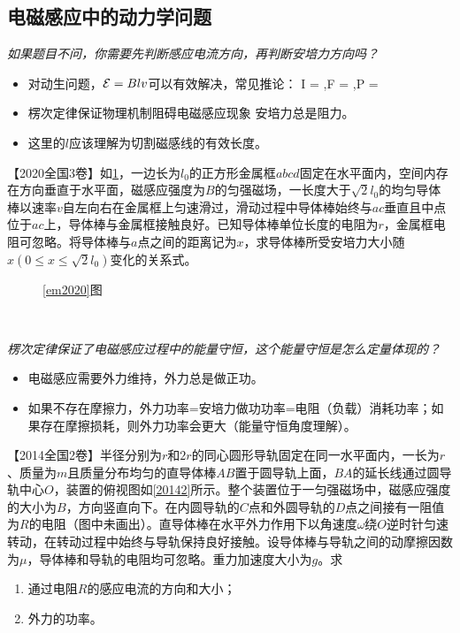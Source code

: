 \documentclass[a4paper,9pt]{ctexart}
\newcommand{\emf}{{\cal E}}
\begin{document}
\subsection{电磁感应中的动力学问题}
\emph{如果题目不问，你需要先判断感应电流方向，再判断安培力方向吗？}
\begin{itemize}
\item
对动生问题，$\emf = Blv$可以有效解决，常见推论：
\beq
I = ,\quad F = ,\quad P = 
\eeq
\item
楞次定律保证物理机制阻碍电磁感应现象 \so 安培力总是阻力。
\item
这里的$l$应该理解为切割磁感线的有效长度。
\end{itemize}
\newpage
\begin{eg} \label{em2020}
【2020全国3卷】如\cref{20203}，一边长为$l_0$的正方形金属框$abcd$固定在水平面内，空间内存在方向垂直于水平面，磁感应强度为$B$的匀强磁场，一长度大于$\sqrt 2 l_0$的均匀导体棒以速率$v$自左向右在金属框上匀速滑过，滑动过程中导体棒始终与$ac$垂直且中点位于$ac$上，导体棒与金属框接触良好。已知导体棒单位长度的电阻为$r$，金属框电阻可忽略。将导体棒与$a$点之间的距离记为$x$，求导体棒所受安培力大小随$x(0\leq x \leq \sqrt 2 l_0)$变化的关系式。
\end{eg}
\begin{figure}[H]
\centering
{}
\caption{\cref{em2020}图\label{20203}}
\end{figure}
\begin{ans}
\ \\
\vspace{6cm}
\end{ans}
\newpage
\par
\emph{楞次定律保证了电磁感应过程中的能量守恒，这个能量守恒是怎么定量体现的？}
\begin{itemize}
\item
电磁感应需要外力维持，外力总是做正功。
\item
如果不存在摩擦力，外力功率=安培力做功功率=电阻（负载）消耗功率；如果存在摩擦损耗，则外力功率会更大（能量守恒角度理解）。
\end{itemize}
\begin{eg} \label{em2014}
【2014全国2卷】半径分别为$r$和$2r$的同心圆形导轨固定在同一水平面内，一长为$r$、质量为$m$且质量分布均匀的直导体棒$AB$置于圆导轨上面，$BA$的延长线通过圆导轨中心$O$，装置的俯视图如\cref{20142}所示。整个装置位于一匀强磁场中，磁感应强度的大小为$B$，方向竖直向下。在内圆导轨的$C$点和外圆导轨的$D$点之间接有一阻值为$R$的电阻（图中未画出）。直导体棒在水平外力作用下以角速度$\omega$绕$O$逆时针匀速转动，在转动过程中始终与导轨保持良好接触。设导体棒与导轨之间的动摩擦因数为$\mu$，导体棒和导轨的电阻均可忽略。重力加速度大小为$g$。求
\begin{enumerate}
\item
通过电阻$R$的感应电流的方向和大小；
\item
外力的功率。
\end{enumerate}
\end{eg}
\end{document}
